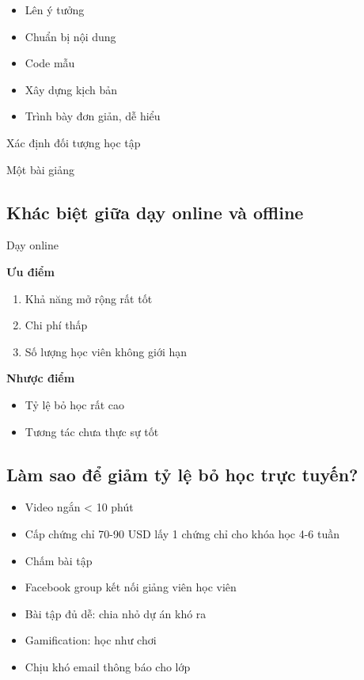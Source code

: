 \begin{itemize}
  \item Lên ý tưởng
  \item Chuẩn bị nội dung
  \item Code mẫu
  \item Xây dựng kịch bản
  \item Trình bày đơn giản, dễ hiểu
\end{itemize}

Xác định đối tượng học tập

Một bài giảng

\subsection{Khác biệt giữa dạy online và offline}

Dạy online

\textbf{Ưu điểm}

\begin{enumerate}
  \item Khả năng mở rộng rất tốt
  \item Chi phí thấp
  \item Số lượng học viên không giới hạn
\end{enumerate}

\textbf{Nhược điểm}

\begin{itemize}
  \item Tỷ lệ bỏ học rất cao
  \item Tương tác chưa thực sự tốt
\end{itemize}

\subsection{Làm sao để giảm tỷ lệ bỏ học trực tuyến?}

\begin{itemize}
  \item Video ngắn < 10 phút
  \item Cấp chứng chỉ 70-90 USD lấy 1 chứng chỉ cho khóa học 4-6 tuần
  \item Chấm bài tập
  \item Facebook group kết nối giảng viên học viên
  \item Bài tập đủ dễ: chia nhỏ dự án khó ra
  \item Gamification: học như chơi
  \item Chịu khó email thông báo cho lớp
\end{itemize}



